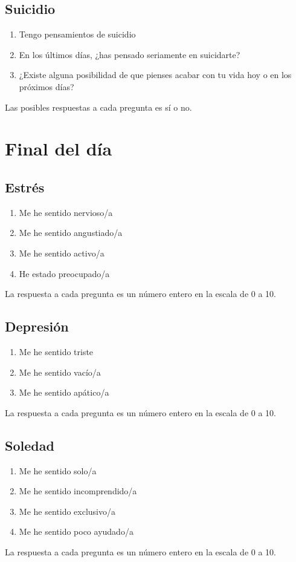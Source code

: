         \subsection{Suicidio}
            \begin{enumerate}
                \item Tengo pensamientos de suicidio
                \item En los últimos días, ¿has pensado seriamente en suicidarte?
                \item ¿Existe alguna posibilidad de que pienses acabar con tu vida hoy o en los próximos días?
            \end{enumerate}
            Las posibles respuestas a cada pregunta es sí o no.

    \section{Final del día}
        \subsection{Estrés}
            \begin{enumerate}
                \item Me he sentido nervioso/a
                \item Me he sentido angustiado/a
                \item Me he sentido activo/a
                \item He estado preocupado/a
            \end{enumerate}
            La respuesta a cada pregunta es un número entero en la escala de 0 a 10.

        \subsection{Depresión}
            \begin{enumerate}
                \item Me he sentido triste
                \item Me he sentido vacío/a 
                \item Me he sentido apático/a
            \end{enumerate}
            La respuesta a cada pregunta es un número entero en la escala de 0 a 10.

        \subsection{Soledad}
            \begin{enumerate}
                \item Me he sentido solo/a
                \item Me he sentido incomprendido/a
                \item Me he sentido exclusivo/a
                \item Me he sentido poco ayudado/a
            \end{enumerate}
            La respuesta a cada pregunta es un número entero en la escala de 0 a 10.

